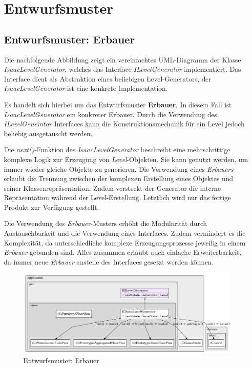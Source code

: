 \chapter{Entwurfsmuster}

\section{Entwurfsmuster: Erbauer}
Die nachfolgende Abbildung zeigt ein vereinfachtes UML-Diagramm der
Klasse \textit{IsaacLevelGenerator}, welches das Interface
\textit{ILevelGenerator} implementiert. Das Interface dient als
Abstraktion eines beliebigen Level-Generators, der
\textit{IsaacLevelGenerator} ist eine konkrete Implementation.

Es handelt sich hierbei um das Entwurfsmuster \textbf{Erbauer}.
In diesem Fall ist \textit{IsaacLevelGenerator} ein konkreter Erbauer. 
Durch die Verwendung des \textit{ILevelGenerator} Interfaces kann
die Konstruktionsmechanik für ein Level jedoch beliebig ausgetauscht
werden.

Die \textit{next()}-Funktion des \textit{IsaacLevelGenerator}
beschreibt eine mehrschrittige komplexe Logik zur Erzeugung von
\textit{Level}-Objekten. Sie kann genutzt werden, um immer wieder
gleiche Objekte zu generieren. Die Verwendung eines \textit{Erbauers}
erlaubt die Trennung zwischen der komplexen Erstellung eines Objektes
und  seiner Klassenrepräsentation. Zudem versteckt der Generator die
interne Repräsentation während der Level-Erstellung. Letztlich wird
nur das fertige Produkt zur Verfügung gestellt.

Die Verwendung des \textit{Erbauer}-Musters erhöht die Modularität
durch Austauschbarkeit und die Verwendung eines Interfaces. Zudem
vermindert es die Komplexität, da unterschiedliche komplexe
Erzeugungsprozesse jeweilig in einem \textit{Erbauer} gebunden sind.
Alles zusammen erlaubt auch einfache Erweiterbarkeit, da immer neue
\textit{Erbauer} anstelle des Interfaces gesetzt werden können.

\vspace{0.5cm}
\begin{figure}[H]
    \centering
    \includegraphics[width=1\linewidth]{Bilder/Visualisierung/IsaacLevelGenerator_structure.png}
    \caption{Entwurfsmuster: Erbauer}
\end{figure}

